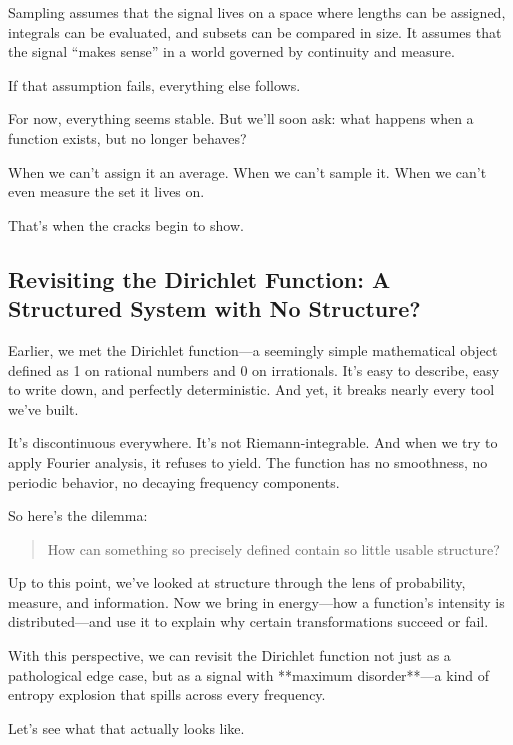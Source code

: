 Sampling assumes that the signal lives on a space where lengths can be assigned, integrals can be evaluated, and subsets can be compared in size. It assumes that the signal “makes sense” in a world governed by continuity and measure.

If that assumption fails, everything else follows.

\medskip

\noindent
For now, everything seems stable. But we’ll soon ask: what happens when a function exists, but no longer behaves?

When we can’t assign it an average.  
When we can’t sample it.  
When we can’t even measure the set it lives on.

That’s when the cracks begin to show.




\subsection{Revisiting the Dirichlet Function: A Structured System with No Structure?}

Earlier, we met the Dirichlet function—a seemingly simple mathematical object defined as 1 on rational numbers and 0 on irrationals. It’s easy to describe, easy to write down, and perfectly deterministic. And yet, it breaks nearly every tool we’ve built.

It’s discontinuous everywhere. It’s not Riemann-integrable. And when we try to apply Fourier analysis, it refuses to yield. The function has no smoothness, no periodic behavior, no decaying frequency components.

So here’s the dilemma:

\begin{quote}
How can something so precisely defined contain so little usable structure?
\end{quote}

Up to this point, we’ve looked at structure through the lens of probability, measure, and information. Now we bring in energy—how a function’s intensity is distributed—and use it to explain why certain transformations succeed or fail.

With this perspective, we can revisit the Dirichlet function not just as a pathological edge case, but as a signal with **maximum disorder**—a kind of entropy explosion that spills across every frequency.

Let’s see what that actually looks like.









